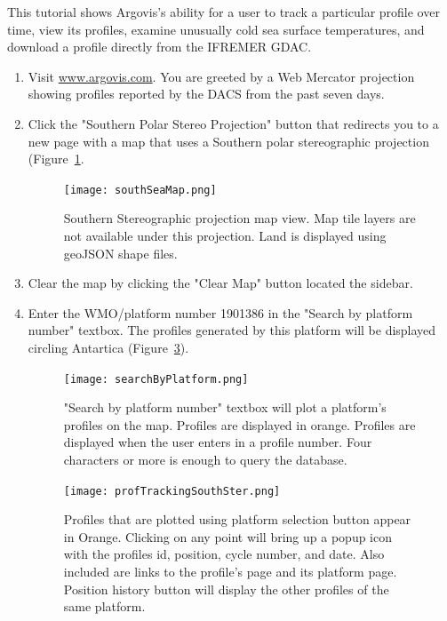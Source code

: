 This tutorial shows Argovis's ability for a user to track a particular profile over time, view its profiles, examine unusually cold sea surface temperatures, and download a profile directly from the IFREMER GDAC.

\begin{enumerate}

\item Visit \url{www.argovis.com}. You are greeted by a Web Mercator projection showing profiles reported by the DACS from the past seven days.

\item Click the "Southern Polar Stereo Projection" button that redirects you to a new page with a map that uses a Southern polar stereographic projection (Figure~\ref{fig:south_map}.

\begin{figure}[H]
\begin{minipage}{6in}
\centering
\texttt{[image: southSeaMap.png]}
\caption{\label{fig:south_map} Southern Stereographic projection map view. Map tile layers are not available under this projection. Land is displayed using geoJSON shape files.}
\end{minipage}
\end{figure}

\item Clear the map by clicking the "Clear Map" button located the sidebar.

\item Enter the WMO/platform number 1901386 in the "Search by platform number" textbox. The profiles generated by this platform will be displayed circling Antartica (Figure~\ref{fig:1901386}).

\begin{figure}[H]
\begin{minipage}{6in}
\centering
\texttt{[image: searchByPlatform.png]}
\caption{\label{fig:platform_search} "Search by platform number" textbox will plot a platform's profiles on the map. Profiles are displayed in orange. Profiles are displayed when the user enters in a profile number. Four characters or more is enough to query the database. }
\end{minipage}
\end{figure}

\begin{figure}[H]
\begin{minipage}{6in}
\centering
\texttt{[image: profTrackingSouthSter.png]}
\caption{\label{fig:1901386} Profiles that are plotted using platform selection button appear in Orange. Clicking on any point will bring up a popup icon with the profiles id, position, cycle number, and date. Also included are links to the profile's page and its platform page. Position history button will display the other profiles of the same platform.}
\end{minipage}
\end{figure}


\end{enumerate}
